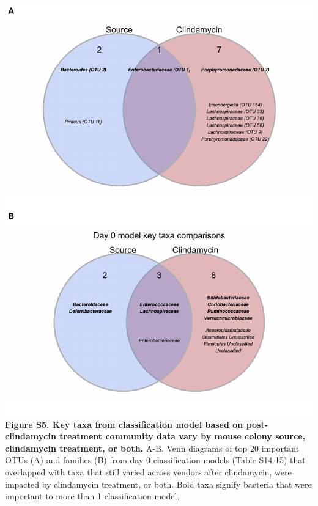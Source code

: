 \documentclass[11pt,]{article}
\begin{document}
\includegraphics{figure_S5.pdf} \textbf{Figure S5. Key taxa from
classification model based on post-clindamycin treatment community data
vary by mouse colony source, clindamycin treatment, or both.} A-B. Venn
diagrams of top 20 important OTUs (A) and families (B) from day 0
classification models (Table S14-15) that overlapped with taxa that
still varied across vendors after clindamycin, were impacted by
clindamycin treatment, or both. Bold taxa signify bacteria that were
important to more than 1 classification model.

\newpage
\end{document}
